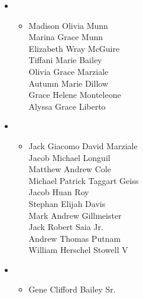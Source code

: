 \documentclass[12pt]{article}
\begin{document}
\begin{minipage}[t]{0.495\textwidth}
\begin{itemize}
\begin{itemize}[topsep=-5pt,itemsep=-1ex,partopsep=1ex,parsep=1ex]
\end{itemize}

\item [] 
\begin{itemize}[topsep=-5pt,itemsep=-1ex,partopsep=1ex,parsep=1ex]
\item [] Madison Olivia Munn\\
Marina Grace Munn\\ Elizabeth Wray McGuire\\ Tiffani Marie Bailey\\ Olivia Grace Marziale\\ Autumn Marie Dillow\\  Grace Helene Monteleone\\ Alyssa Grace Liberto
\end{itemize}

\item [] 
\begin{itemize}[topsep=-5pt,itemsep=-1ex,partopsep=1ex,parsep=1ex]
\item [] Jack Giacomo David Marziale\\  Jacob Michael Longuil\\  Matthew Andrew Cole\\ Michael Patrick Taggart Geiss\\ Jacob Huan Roy\\ Stephan Elijah Davis\\ Mark Andrew Gillmeister\\ Jack Robert Saia Jr.\\ Andrew Thomas Putnam\\ William Herschel Stowell V
\end{itemize}

\item [] 
\begin{itemize}[topsep=-5pt,itemsep=-1ex,partopsep=1ex,parsep=1ex]
\item [] Gene Clifford Bailey Sr.
\end{itemize}

\end{itemize}
\end{minipage}

\vspace*{\fill}

\newpage
\end{document}
